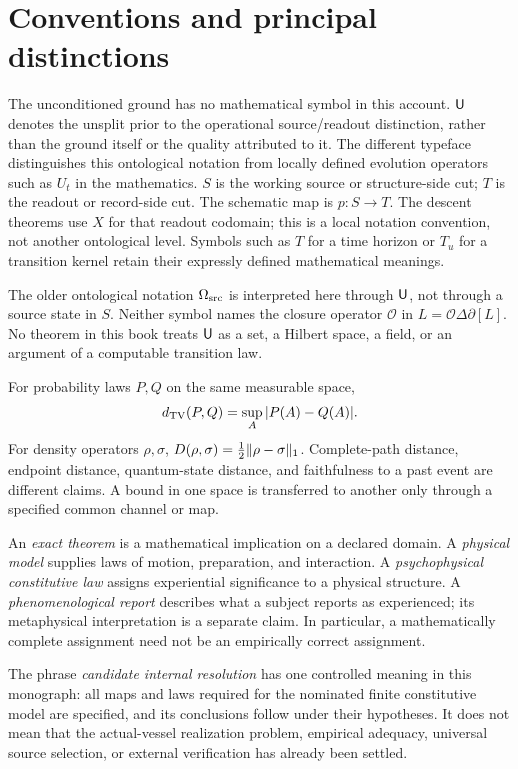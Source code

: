 \normalsize
\chapter*{Conventions and principal distinctions}\label{chapter:conventions-and-principal-distinctions}
The unconditioned ground has no mathematical symbol in this account. $\mathsf{U}$ denotes the unsplit prior to the operational source/readout distinction, rather than the ground itself or the quality attributed to it. The different typeface distinguishes this ontological notation from locally defined evolution operators such as $U_t$ in the mathematics. $S$ is the working source or structure-side cut; $T$ is the readout or record-side cut. The schematic map is $p:S\to T$. The descent theorems use $X$ for that readout codomain; this is a local notation convention, not another ontological level. Symbols such as $T$ for a time horizon or $T_u$ for a transition kernel retain their expressly defined mathematical meanings.

The older ontological notation $\Omega_{\mathrm{src}}$ is interpreted here through $\mathsf{U}$, not through a source state in $S$. Neither symbol names the closure operator $\mathcal O$ in $L=\mathcal O\Delta\partial[L]$. No theorem in this book treats $\mathsf{U}$ as a set, a Hilbert space, a field, or an argument of a computable transition law.



For probability laws $P,Q$ on the same measurable space,
\[
d_{\mathrm{TV}}(P,Q)=\sup_A|P(A)-Q(A)|.
\]
For density operators $\rho,\sigma$, $D(\rho,\sigma)=\tfrac12\lVert \rho-\sigma\rVert_1$. Complete-path distance, endpoint distance, quantum-state distance, and faithfulness to a past event are different claims. A bound in one space is transferred to another only through a specified common channel or map.

An \emph{exact theorem} is a mathematical implication on a declared domain. A \emph{physical model} supplies laws of motion, preparation, and interaction. A \emph{psychophysical constitutive law} assigns experiential significance to a physical structure. A \emph{phenomenological report} describes what a subject reports as experienced; its metaphysical interpretation is a separate claim. In particular, a mathematically complete assignment need not be an empirically correct assignment.

The phrase \emph{candidate internal resolution} has one controlled meaning in this monograph: all maps and laws required for the nominated finite constitutive model are specified, and its conclusions follow under their hypotheses. It does not mean that the actual-vessel realization problem, empirical adequacy, universal source selection, or external verification has already been settled.
\clearpage
